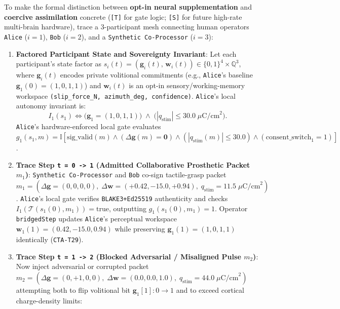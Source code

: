 \documentclass[10pt,letterpaper]{article}
\providecommand{\tightlist}{\setlength{\itemsep}{1pt}\setlength{\parskip}{0pt}}
\begin{document}
To make the formal distinction between \textbf{opt-in neural
supplementation} and \textbf{coercive assimilation} concrete
(\texttt{{[}T{]}} for gate logic; \texttt{{[}S{]}} for future high-rate
multi-brain hardware), trace a 3-participant mesh connecting human
operators \texttt{Alice} (\(i=1\)), \texttt{Bob} (\(i=2\)), and a
\texttt{Synthetic\ Co-\allowbreak{}Processor} (\(i=3\)):

\begin{enumerate}
\def\labelenumi{\arabic{enumi}.}
\tightlist
\item
  \textbf{Factored Participant State and Sovereignty Invariant}: Let
  each participant's state factor as
  \(s_i(t) = (\mathbf{g}_i(t),\, \mathbf{w}_i(t)) \in \{0,1\}^4 \times \mathbb{Q}^3\),
  where \(\mathbf{g}_i(t)\) encodes private volitional commitments
  (e.g., \texttt{Alice}'s baseline \(\mathbf{g}_1(0) = (1, 0, 1, 1)\))
  and \(\mathbf{w}_i(t)\) is an opt-in sensory/working-memory workspace
  \texttt{(\allowbreak{}slip\_\allowbreak{}force\_\allowbreak{}N,\allowbreak{}\ azimuth\_\allowbreak{}deg,\allowbreak{}\ confidence)}.
  \texttt{Alice}'s local autonomy invariant is:
  \[I_1(s_1) \iff \bigl(\mathbf{g}_1 = (1, 0, 1, 1)\bigr) \;\wedge\; \bigl(|q_{\text{stim}}| \le 30.0\;\mu\text{C/cm}^2\bigr).\]
  \texttt{Alice}'s hardware-enforced local gate evaluates
  \(g_1(s_1, m) = \mathbb{I}[\text{sig\_valid}(m) \wedge (\Delta\mathbf{g}(m) = \mathbf{0}) \wedge (|q_{\text{stim}}(m)| \le 30.0) \wedge (\text{consent\_switch}_1 = 1)]\).
\item
  \textbf{Trace Step \texttt{t\ =\ 0\ -\textgreater{}\ 1} (Admitted
  Collaborative Prosthetic Packet \(m_1\))}:
  \texttt{Synthetic\ Co-\allowbreak{}Processor} and \texttt{Bob} co-sign
  tactile-grasp packet
  \(m_1 = (\Delta\mathbf{g} = (0,0,0,0),\; \Delta\mathbf{w} = (+0.42, -15.0, +0.94),\; q_{\text{stim}} = 11.5\;\mu\text{C/cm}^2)\).
  \texttt{Alice}'s local gate verifies \texttt{BLAKE3+Ed25519}
  authenticity and checks
  \(I_1(\mathcal{T}(s_1(0), m_1)) = \text{true}\), outputting
  \(g_1(s_1(0), m_1) = 1\). Operator \texttt{bridgedStep} updates
  \texttt{Alice}'s perceptual workspace
  \(\mathbf{w}_1(1) = (0.42, -15.0, 0.94)\) while preserving
  \(\mathbf{g}_1(1) = (1, 0, 1, 1)\) identically (\texttt{CTA-T29}).
\item
  \textbf{Trace Step \texttt{t\ =\ 1\ -\textgreater{}\ 2} (Blocked
  Adversarial / Misaligned Pulse \(m_2\))}: Now inject adversarial or
  corrupted packet
  \(m_2 = (\Delta\mathbf{g} = (0, +1, 0, 0),\; \Delta\mathbf{w} = (0.0, 0.0, 1.0),\; q_{\text{stim}} = 44.0\;\mu\text{C/cm}^2)\)
  attempting both to flip volitional bit \(\mathbf{g}_1[1] : 0 \to 1\)
  and to exceed cortical charge-density limits:


\end{enumerate}
\end{document}
